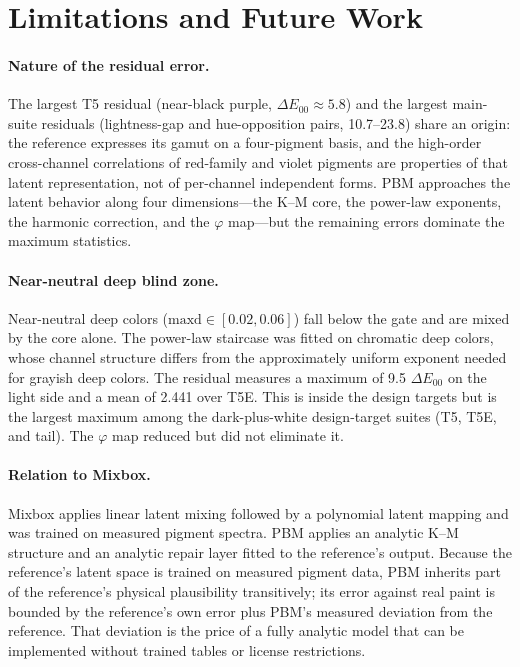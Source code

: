 \section{Limitations and Future Work}
\label{sec:limitations}

\paragraph{Nature of the residual error.}
The largest T5 residual (near-black purple, $\Delta E_{00}\approx5.8$) and the largest main-suite residuals (lightness-gap and hue-opposition pairs, 10.7--23.8) share an origin: the reference expresses its gamut on a four-pigment basis, and the high-order cross-channel correlations of red-family and violet pigments are properties of that latent representation, not of per-channel independent forms. PBM approaches the latent behavior along four dimensions---the K--M core, the power-law exponents, the harmonic correction, and the $\varphi$ map---but the remaining errors dominate the maximum statistics.

\paragraph{Near-neutral deep blind zone.}
Near-neutral deep colors ($\mathrm{maxd}\in[0.02,0.06]$) fall below the gate and are mixed by the core alone. The power-law staircase was fitted on chromatic deep colors, whose channel structure differs from the approximately uniform exponent needed for grayish deep colors. The residual measures a maximum of 9.5 $\Delta E_{00}$ on the light side and a mean of 2.441 over T5E. This is inside the design targets but is the largest maximum among the dark-plus-white design-target suites (T5, T5E, and tail). The $\varphi$ map reduced but did not eliminate it.

\paragraph{Relation to Mixbox.}
Mixbox applies linear latent mixing followed by a polynomial latent mapping and was trained on measured pigment spectra. PBM applies an analytic K--M structure and an analytic repair layer fitted to the reference's output. Because the reference's latent space is trained on measured pigment data, PBM inherits part of the reference's physical plausibility transitively; its error against real paint is bounded by the reference's own error plus PBM's measured deviation from the reference. That deviation is the price of a fully analytic model that can be implemented without trained tables or license restrictions.

